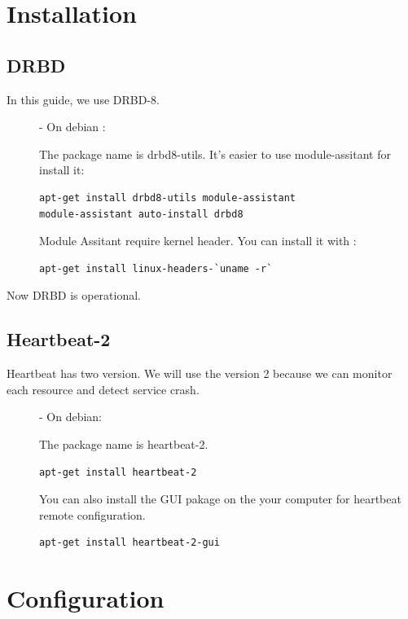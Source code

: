 \documentclass[a4paper,10pt]{report}
\begin{document}
\chapter{Installation}
\section{DRBD}
In this guide, we use DRBD-8.
\begin{description}
\item[]- On debian :

The package name is drbd8-utils. It's easier to use module-assitant for install it:
\begin{lstlisting}
apt-get install drbd8-utils module-assistant
module-assistant auto-install drbd8
\end{lstlisting} 



Module Assitant require kernel header. You can install it with :
\begin{lstlisting}
apt-get install linux-headers-`uname -r`
\end{lstlisting}

\end{description}

Now DRBD is operational.


\section{Heartbeat-2}
Heartbeat has two version. We will use the version 2 because we can monitor each resource and detect service crash.
\begin{description}
\item[]- On debian:

The package name is heartbeat-2.
\begin{lstlisting}
apt-get install heartbeat-2
\end{lstlisting}
You can also install the GUI pakage on the your computer for heartbeat remote configuration.
\begin{lstlisting}
apt-get install heartbeat-2-gui
\end{lstlisting}
\end{description}











\chapter{Configuration}
\end{document}
